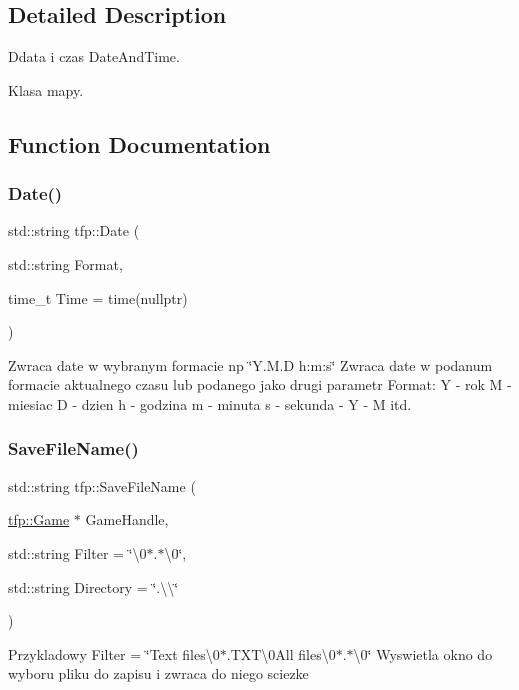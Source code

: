 \subsection{Detailed Description}
Ddata i czas Date\+And\+Time. 

Klasa mapy. 

\subsection{Function Documentation}
\mbox{\label{namespacetfp_aab9c5625cca52707bd8c9c24f331a564}} 
\subsubsection{\texorpdfstring{Date()}{Date()}}
{\footnotesize\ttfamily std\+::string tfp\+::\+Date (\begin{DoxyParamCaption}\item[{std\+::string}]{Format,  }\item[{time\+\_\+t}]{Time = {\ttfamily time(nullptr)} }\end{DoxyParamCaption})}

Zwraca date w wybranym formacie np \char`\"{}\+Y.\+M.\+D h\+:m\+:s\char`\"{} Zwraca date w podanum formacie aktualnego czasu lub podanego jako drugi parametr Format\+: Y -\/ rok M -\/ miesiac D -\/ dzien h -\/ godzina m -\/ minuta s -\/ sekunda  -\/ Y  -\/ M itd. \mbox{\label{namespacetfp_aaa8d845d24a60e21835915c3c0a93403}} 
\subsubsection{\texorpdfstring{Save\+File\+Name()}{SaveFileName()}}
{\footnotesize\ttfamily std\+::string tfp\+::\+Save\+File\+Name (\begin{DoxyParamCaption}\item[{\mbox{\hyperlink{classtfp_1_1_game}{tfp\+::\+Game}} $\ast$}]{Game\+Handle,  }\item[{std\+::string}]{Filter = {\ttfamily \char`\"{}\textbackslash{}0$\ast$.$\ast$\textbackslash{}0\char`\"{}},  }\item[{std\+::string}]{Directory = {\ttfamily \char`\"{}.\textbackslash{}\textbackslash{}\char`\"{}} }\end{DoxyParamCaption})}

Przykladowy Filter = \char`\"{}\+Text files\textbackslash{}0$\ast$.\+T\+X\+T\textbackslash{}0\+All files\textbackslash{}0$\ast$.$\ast$\textbackslash{}0\char`\"{} Wyswietla okno do wyboru pliku do zapisu i zwraca do niego sciezke 
